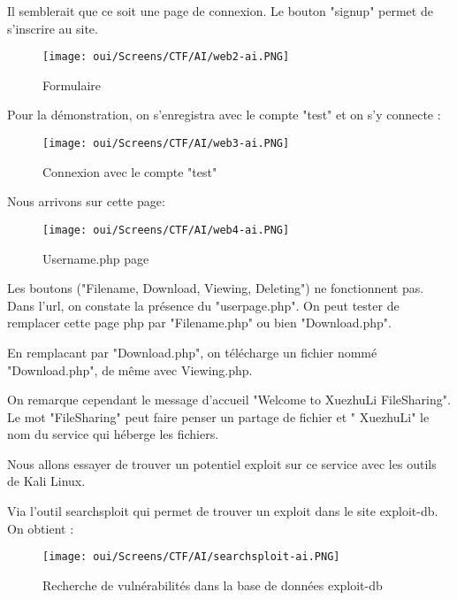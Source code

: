 \newpage
\noindent Il semblerait que ce soit une page de connexion. Le bouton "signup" permet de s'inscrire au site.

\begin{figure}[htp!]
  \centering
  \setlength\figureheight{7cm}
  \setlength\figurewidth{9cm}
  \texttt{[image: oui/Screens/CTF/AI/web2-ai.PNG]}
  \caption{Formulaire}
  \label{fig:courbe-tikz}
\end{figure}

\noindent Pour la démonstration, on s'enregistra avec le compte "test" et on s'y connecte :

\begin{figure}[htp!]
  \centering
  \setlength\figureheight{7cm}
  \setlength\figurewidth{9cm}
  \texttt{[image: oui/Screens/CTF/AI/web3-ai.PNG]}
  \caption{Connexion avec le compte "test"}
  \label{fig:courbe-tikz}
\end{figure}

\noindent Nous arrivons sur cette page:
\newpage
\begin{figure}[htp!]
  \centering
  \setlength\figureheight{7cm}
  \setlength\figurewidth{9cm}
  \texttt{[image: oui/Screens/CTF/AI/web4-ai.PNG]}
  \caption{Username.php page}
  \label{fig:courbe-tikz}
\end{figure}

\noindent Les boutons ("Filename, Download, Viewing, Deleting") ne fonctionnent pas.\\

\noindent Dans l'url, on constate la présence du "userpage.php". On peut tester de remplacer cette page php par "Filename.php" ou bien "Download.php".

\noindent En remplacant par "Download.php", on télécharge un fichier nommé "Download.php", de même avec Viewing.php.

\noindent On remarque cependant le message d'accueil "Welcome to XuezhuLi FileSharing". Le mot "FileSharing" peut faire penser un partage de fichier et " XuezhuLi" le nom du service qui héberge les fichiers.

\noindent Nous allons essayer de trouver un potentiel exploit sur ce service avec les outils de Kali Linux.

\noindent Via l'outil searchsploit qui permet de trouver un exploit dans le site exploit-db. On obtient :

\begin{figure}[htp!]
  \centering
  \setlength\figureheight{7cm}
  \setlength\figurewidth{9cm}
  \texttt{[image: oui/Screens/CTF/AI/searchsploit-ai.PNG]}
  \caption{Recherche de vulnérabilités dans la base de données exploit-db}
  \label{fig:courbe-tikz}
\end{figure}

